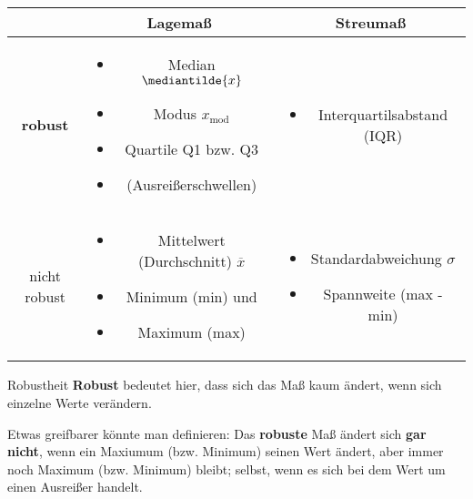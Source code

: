 \begin{tabular}{|c|c|c|}
  \hline
   & Lagemaß & Streumaß \\
  \hline
  \textbf{robust} &
  \begin{minipage} [t] {0.4\textwidth}
    \begin{itemize}
    \item Median $\mediantilde{x}$
    \item Modus $x_{\textrm{mod}}$
    \item Quartile Q1 bzw. Q3
    \item (Ausreißerschwellen)
  \end{itemize} \end{minipage}
  & \begin{minipage} [t] {0.4\textwidth}
    \begin{itemize}
    \item Interquartilsabstand (IQR)
  \end{itemize} \end{minipage} \\
  \hline
  nicht robust & \begin{minipage} [t] {0.4\textwidth}
    \begin{itemize}
    \item Mittelwert (Durchschnitt) $\overline{x}$
    \item Minimum (min) und
    \item Maximum (max)
  \end{itemize} \end{minipage} & \begin{minipage} [t] {0.4\textwidth}
    \begin{itemize}
    \item Standardabweichung $\sigma$
    \item Spannweite (max - min)
  \end{itemize} \end{minipage} \\
  \hline
  \end{tabular} 

\begin{definition}{Robustheit}{}
\textbf{Robust} bedeutet hier, dass sich das Maß kaum ändert, wenn sich einzelne
Werte verändern.

Etwas greifbarer könnte man definieren: Das \textbf{robuste} Maß
ändert sich \textbf{gar nicht}, wenn ein Maxiumum (bzw. Minimum)
seinen Wert ändert, aber immer noch Maximum (bzw. Minimum) bleibt;
selbst, wenn es sich bei dem Wert um einen Ausreißer handelt.
\end{definition}
\newpage



